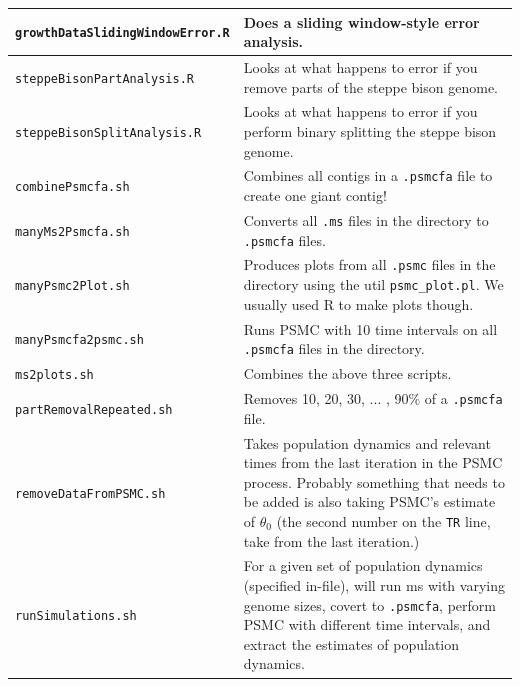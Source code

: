\documentclass[11pt,a4paper]{article}
\begin{document}
\begin{table}[h]
\begin{tabular}{p{6.5cm}p{8.5cm}}
\texttt{growthDataSlidingWindowError.R} & Does a sliding window-style error analysis. \\ \hline
\texttt{steppeBisonPartAnalysis.R} & Looks at what happens to error if you remove parts of the steppe bison genome. \\ \hline
\texttt{steppeBisonSplitAnalysis.R} & Looks at what happens to error if you perform binary splitting the steppe bison genome. \\ \hline
\texttt{combinePsmcfa.sh} & Combines all contigs in a \verb|.psmcfa| file to create one giant contig! \\ \hline
\texttt{manyMs2Psmcfa.sh} & Converts all \verb|.ms| files in the directory to \verb|.psmcfa| files. \\ \hline
\texttt{manyPsmc2Plot.sh} & Produces plots from all \verb|.psmc| files in the directory using the util \verb|psmc_plot.pl|. We usually used R to make plots though. \\ \hline
\texttt{manyPsmcfa2psmc.sh} & Runs PSMC with 10 time intervals on all \verb|.psmcfa| files in the directory. \\ \hline
\texttt{ms2plots.sh} & Combines the above three scripts. \\ \hline
\texttt{partRemovalRepeated.sh} & Removes 10, 20, 30, ... , 90\% of a \verb|.psmcfa| file. \\ \hline
\texttt{removeDataFromPSMC.sh} & Takes population dynamics and relevant times from the last iteration in the PSMC process. Probably something that needs to be added is also taking PSMC's estimate of $\theta_0$ (the second number on the \verb|TR| line, take from the last iteration.)\\ \hline
\texttt{runSimulations.sh} & For a given set of population dynamics (specified in-file), will run ms with varying genome sizes, covert to \verb|.psmcfa|, perform PSMC with different time intervals, and extract the estimates of population dynamics. \\ \hline
\end{tabular}
\end{table}
\end{document}
